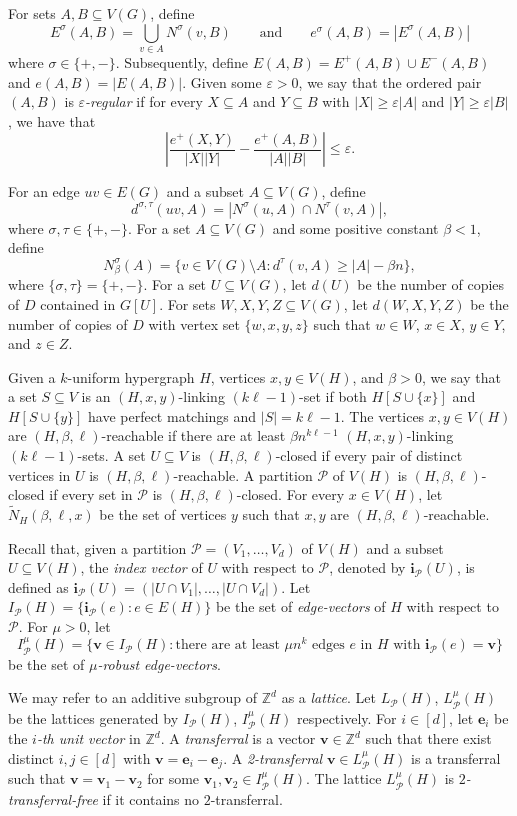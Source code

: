 \documentclass[11pt]{amsart}
\newcommand{\CP}{\mathcal{P}}
\newcommand{\wt}{\widetilde}
\newcommand{\veps}{\varepsilon}
\begin{document}
For sets $A,B\subseteq V(G)$, define 
$$E^\sigma(A,B)=\bigcup_{v\in A}N^\sigma(v,B)\qquad \text{and} \qquad e^\sigma(A,B)=|E^\sigma(A,B)|$$ where $\sigma\in\{+,-\}$.
Subsequently, define $E(A,B)=E^+(A,B)\cup E^-(A,B)$ and $e(A,B)=|E(A,B)|$.
Given some $\veps>0$, we say that the ordered pair $(A,B)$ is \textit{$\veps$-regular} if for every $X\subseteq A$ and $Y\subseteq B$ with $|X|\ge \veps|A|$ and $|Y|\ge \veps |B|$, we have that 
$$\left|\frac{e^+(X,Y)}{|X||Y|}-\frac{e^+(A,B)}{|A||B|}\right|\le \veps.$$ 

For an edge $uv\in E(G)$ and a subset $A\subseteq V(G)$, define 
$$d^{\sigma,\tau}(uv,A)=|N^\sigma(u,A)\cap N^\tau(v,A)|,$$ where $\sigma,\tau\in\{+,-\}$.
For a set $A\subseteq V(G)$ and some positive constant $\beta<1$, define $$N^\sigma_\beta(A)=\{v\in V(G) \setminus A :d^\tau(v,A)\ge |A|-\beta n\},$$ where $\{\sigma,\tau\}=\{+,-\}$.
For a set $U\subseteq V(G)$, let $d(U)$ be the number of copies of $D$ contained in $G[U]$.
For sets $W,X,Y,Z\subseteq V(G)$, let $d(W,X,Y,Z)$ be the number of copies of $D$ with vertex set $\{w,x,y,z\}$ such that $w\in W$, $x \in X$, $y \in Y$, and $z\in Z$.


Given a $k$-uniform hypergraph $H$, vertices $x,y\in V(H)$, and $\beta>0$, we say that a set $S\subseteq V$ is an $(H,x,y)$-linking $(k\ell-1)$-set if both $H[S\cup\{x\}]$ and $H[S\cup\{y\}]$ have perfect matchings and $|S|=k\ell-1$.
The vertices $x, y \in V(H)$ are $(H,\beta,\ell)$-reachable if there are at least $\beta n^{k\ell-1}$ $(H,x,y)$-linking $(k\ell-1)$-sets.
A set $U\subseteq V$ is $(H,\beta,\ell)$-closed if every pair of distinct vertices in $U$ is $(H,\beta,\ell)$-reachable.
A partition $\CP$ of $V(H)$ is $(H,\beta,\ell)$-closed if every set in $\CP$ is $(H,\beta,\ell)$-closed.
For every $x\in V(H)$, let $\wt N_H(\beta,\ell,x)$ be the set of vertices $y$ such that $x,y$ are $(H,\beta,\ell)$-reachable.

Recall that, given a partition $\CP=(V_1,\dots,V_d)$ of $V(H)$ and a subset $U\subseteq V(H)$, the \emph{index vector} of $U$ with respect to $\CP$, denoted by $\mathbf{i}_\CP(U)$, is defined as $\mathbf{i}_\CP(U)=(|U\cap V_1|,\dots,|U\cap V_d|)$.
Let $I_\CP(H)=\{\mathbf{i}_\CP(e):e\in E(H)\}$ be the set of \emph{edge-vectors} of $H$ with respect to $\CP$.
For $\mu>0$, let
$$I_\CP^\mu(H)=\{\mathbf{v}\in I_\CP(H):\text{there are at least $\mu n^k$ edges $e$ in $H$ with $\mathbf{i}_\CP(e)=\mathbf{v}$}  \}$$ be the set of \emph{$\mu$-robust edge-vectors}.

We may refer to an additive subgroup of $\mathbb{Z}^d$ as a \emph{lattice}.
Let $L_\CP(H)$, $L_\CP^\mu(H)$ be the lattices generated by $I_\CP(H)$, $I_\CP^\mu(H)$ respectively.
For $i\in [d]$, let $\mathbf{e}_i$ be the \emph{$i$-th unit vector} in $\mathbb{Z}^d$.
A \emph{transferral} is a vector $\mathbf{v}\in\mathbb{Z}^d$ such that there exist distinct $i,j\in[d]$ with $\mathbf{v}=\mathbf{e}_i-\mathbf{e}_j$.
A \emph{2-transferral} $\mathbf{v}\in L_\CP^\mu(H)$ is a transferral such that $\mathbf{v}=\mathbf{v}_1-\mathbf{v}_2$ for some $\mathbf{v}_1,\mathbf{v}_2\in I_\CP^\mu(H)$.
The lattice $L_\CP^\mu(H)$ is \emph{$2$-transferral-free} if it contains no $2$-transferral.
\end{document}
